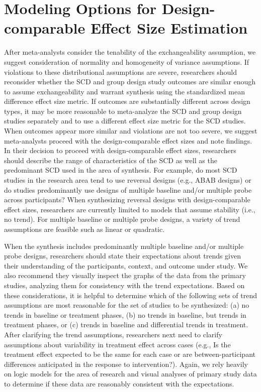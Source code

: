 \documentclass[
]{book}
\begin{document}
\hypertarget{modeling-options-for-design-comparable-effect-size-estimation}{%
\section{Modeling Options for Design-comparable Effect Size Estimation}\label{modeling-options-for-design-comparable-effect-size-estimation}}

After meta-analysts consider the tenability of the exchangeability assumption, we suggest consideration of normality and homogeneity of variance assumptions. If violations to these distributional assumptions are severe, researchers should reconsider whether the SCD and group design study outcomes are similar enough to assume exchangeability and warrant synthesis using the standardized mean difference effect size metric. If outcomes are substantially different across design types, it may be more reasonable to meta-analyze the SCD and group design studies separately and to use a different effect size metric for the SCD studies. When outcomes appear more similar and violations are not too severe, we suggest meta-analysts proceed with the design-comparable effect sizes and note findings. In their decision to proceed with design-comparable effect sizes, researchers should describe the range of characteristics of the SCD as well as the predominant SCD used in the area of synthesis. For example, do most SCD studies in the research area tend to use reversal designs (e.g., ABAB designs) or do studies predominantly use designs of multiple baseline and/or multiple probe across participants? When synthesizing reversal designs with design-comparable effect sizes, researchers are currently limited to models that assume stability (i.e., no trend). For multiple baseline or multiple probe designs, a variety of trend assumptions are feasible such as linear or quadratic.

When the synthesis includes predominantly multiple baseline and/or multiple probe designs, researchers should state their expectations about trends given their understanding of the participants, context, and outcome under study. We also recommend they visually inspect the graphs of the data from the primary studies, analyzing them for consistency with the trend expectations. Based on these considerations, it is helpful to determine which of the following sets of trend assumptions are most reasonable for the set of studies to be synthesized: (a) no trends in baseline or treatment phases, (b) no trends in baseline, but trends in treatment phases, or (c) trends in baseline and differential trends in treatment. After clarifying the trend assumptions, researchers next need to clarify assumptions about variability in treatment effect across cases (e.g., Is the treatment effect expected to be the same for each case or are between-participant differences anticipated in the response to intervention?). Again, we rely heavily on logic models for the area of research and visual analyses of primary study data to determine if these data are reasonably consistent with the expectations.
\end{document}
